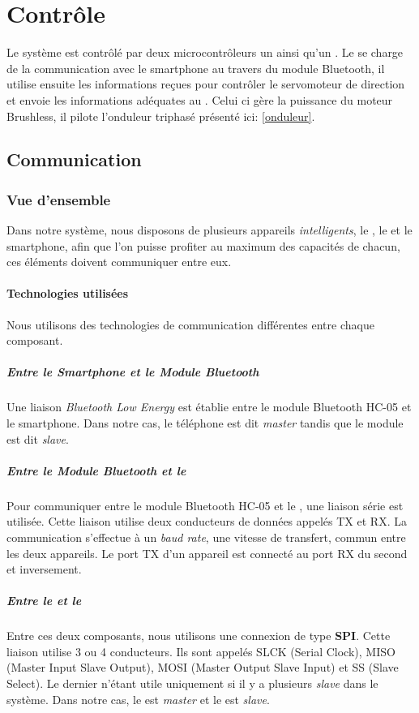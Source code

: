 	\chapter{Contrôle}
	Le système est contrôlé par deux microcontrôleurs un \pic ainsi qu'un \dspic. Le \pic se charge de la communication avec le smartphone au travers du module Bluetooth, il utilise ensuite les informations reçues pour contrôler le servomoteur de direction et envoie les informations adéquates au \dspic. Celui ci gère la puissance du moteur Brushless, il pilote l'onduleur triphasé présenté ici: \ref{onduleur}.
		\section{Communication}
			\subsection{Vue d'ensemble}
				Dans notre système, nous disposons de plusieurs appareils \textit{intelligents}, le \pic , le \dspic et le smartphone, afin que l'on puisse profiter au maximum des capacités de chacun, ces éléments doivent communiquer entre eux.
				\subsubsection{Technologies utilisées}
				Nous utilisons des technologies de communication différentes entre chaque composant.
				\paragraph{Entre le \textit{Smartphone} et le \textit{Module Bluetooth}} Une liaison \textit{Bluetooth Low Energy} est établie entre le module Bluetooth HC-05 et le smartphone. Dans notre cas, le téléphone est dit \textit{master} tandis que le module est dit \textit{slave}.
				\paragraph{Entre le \textit{Module Bluetooth} et le \textit{\pic} } Pour communiquer entre le module Bluetooth HC-05 et le \pic, une liaison série est utilisée. Cette liaison utilise deux conducteurs de données appelés TX et RX. La communication s'effectue à un \textit{baud rate}, une vitesse de transfert, commun entre les deux appareils. Le port TX d'un appareil est connecté au port RX du second et inversement.
				\paragraph{Entre le \textit{\dspic} et le \textit{\pic}} Entre ces deux composants, nous utilisons une connexion de type \textbf{SPI}. Cette liaison utilise 3 ou 4 conducteurs. Ils sont appelés SLCK (\textsf{Serial Clock}), MISO (\textsf{Master Input Slave Output}), MOSI (\textsf{Master Output Slave Input})  et SS (\textsf{Slave Select}). Le dernier n'étant utile uniquement si il y a plusieurs \textit{slave} dans le système. Dans notre cas, le \pic est \textit{master} et le \dspic est \textit{slave}.
				
